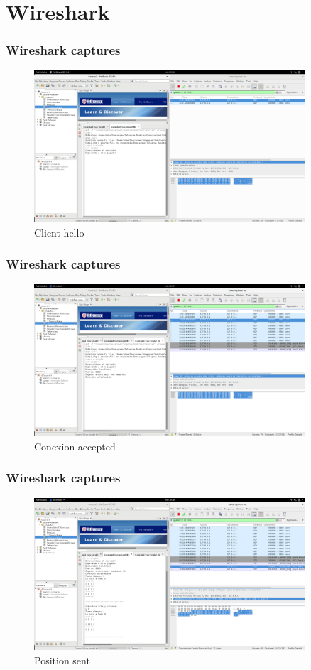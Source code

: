 \documentclass{beamer}
\begin{document}
\section{Wireshark}
\begin{frame}
	\frametitle{Wireshark captures}
	\begin{figure}[H]
    	\centering
     \includegraphics[width=0.9\textwidth]{1.png}
     \caption{Client hello}
     \end{figure}
\end{frame}

\begin{frame}
	\frametitle{Wireshark captures}
	\begin{figure}[H]
    	\centering
     \includegraphics[width=0.9\textwidth]{2.png}
     \caption{Conexion accepted}
     \end{figure}
\end{frame}

\begin{frame}
	\frametitle{Wireshark captures}
	\begin{figure}[H]
    	\centering
     \includegraphics[width=0.9\textwidth]{3.png}
     \caption{Position sent}
     \end{figure}
\end{frame}
\end{document}
